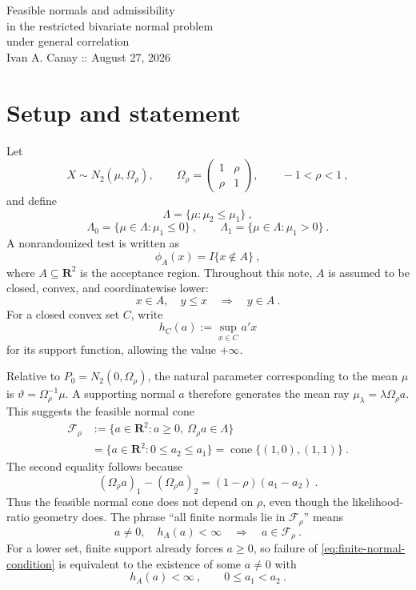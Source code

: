 \documentclass[12pt]{article}
\theoremstyle{remark}
\begin{document}
\begin{center}
{\Large Feasible normals and admissibility\\ in the restricted bivariate normal problem\\ under general correlation}\\[3pt]
{\small Ivan A. Canay :: August 27, 2026}
\end{center}

\medskip

\section*{Setup and statement}

Let
\[
X\sim N_2(\mu,\Omega_\rho),
\qquad
\Omega_\rho=
\begin{pmatrix}
1&\rho\\
\rho&1
\end{pmatrix},
\qquad -1<\rho<1~,
\]
and define
\[
\Lambda=\{\mu:\mu_2\le \mu_1\}~,
\]
\[
\Lambda_0=\{\mu\in\Lambda:\mu_1\le0\}~,
\qquad
\Lambda_1=\{\mu\in\Lambda:\mu_1>0\}~.
\]
A nonrandomized test is written as
\[
\phi_A(x)=I\{x\notin A\}~,
\]
where $A\subseteq\mathbf R^2$ is the acceptance region.  Throughout this note,
$A$ is assumed to be closed, convex, and coordinatewise lower:
\[
x\in A,
\quad y\le x
\quad\Longrightarrow\quad
y\in A~.
\]
For a closed convex set $C$, write
\[
h_C(a):=\sup_{x\in C}a'x
\]
for its support function, allowing the value $+\infty$.

Relative to $P_0=N_2(0,\Omega_\rho)$, the natural parameter corresponding to
the mean $\mu$ is $\vartheta=\Omega_\rho^{-1}\mu$.  A supporting normal $a$
therefore generates the mean ray $\mu_\lambda=\lambda\Omega_\rho a$.  This
suggests the feasible normal cone
\begin{equation}\label{eq:feasible-cone-general}
\begin{split}
\mathcal F_\rho
&:=\{a\in\mathbf R^2:a\ge0,\ \Omega_\rho a\in\Lambda\}\\
&=\{a\in\mathbf R^2:0\le a_2\le a_1\}
=\operatorname{cone}\{(1,0),(1,1)\}~.
\end{split}
\end{equation}
The second equality follows because
\[
(\Omega_\rho a)_1-(\Omega_\rho a)_2
=(1-\rho)(a_1-a_2)~.
\]
Thus the feasible normal cone does not depend on $\rho$, even though the
likelihood-ratio geometry does.  The phrase ``all finite normals lie in
$\mathcal F_\rho$'' means
\begin{equation}\label{eq:finite-normal-condition}
a\ne0,
\quad h_A(a)<\infty
\quad\Longrightarrow\quad
a\in\mathcal F_\rho~.
\end{equation}
For a lower set, finite support already forces $a\ge0$, so failure of
\eqref{eq:finite-normal-condition} is equivalent to the existence of some
$a\ne0$ with
\[
h_A(a)<\infty~,
\qquad
0\le a_1<a_2~.
\]
\end{document}
